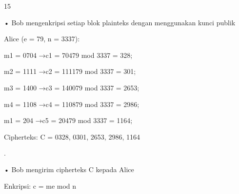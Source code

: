 \documentclass{article}
\begin{document}

15

• Bob mengenkripsi setiap blok plainteks dengan menggunakan kunci publik 

Alice (e = 79, n = 3337):


m1 = 0704 →c1 = 70479 mod 3337 = 328;

m2 = 1111 →c2 = 111179 mod 3337 = 301;

m3 = 1400 →c3 = 140079 mod 3337 = 2653;

m4 = 1108 →c4 = 110879 mod 3337 = 2986; 

m1 = 204 →c5 = 20479 mod 3337 = 1164; 


    Cipherteks: C = 0328, 0301, 2653, 2986, 1164

.

• Bob mengirim cipherteks C kepada Alice

Enkripsi: c = me mod n
\end{document}
